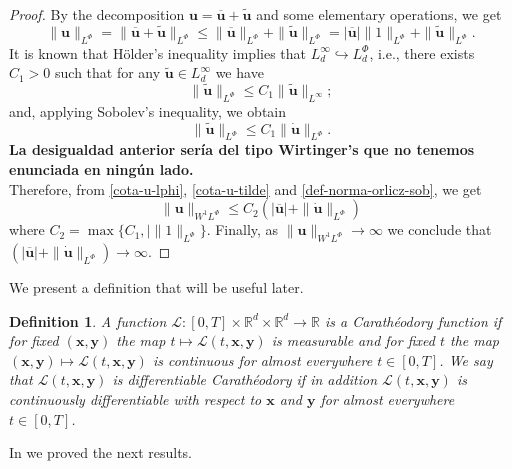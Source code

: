 \documentclass[twoside]{article}
\newtheorem{defi}[thm]{Definition}
\theoremstyle{remark}
\newcommand{\orlnor}{\|_{L^{\Phi}}}
\newcommand{\lphi}{L^{\Phi}}
\newcommand{\sobnor}{\|_{W^{1}\lphi}}
\renewcommand{\b}[1]{\boldsymbol{#1}}
\renewcommand{\leq}{\leqslant}
\begin{document}
\begin{proof}
By the decomposition $\b{u}=\b{\overline u}+\b{\tilde{u}}$ and some elementary operations, 
we get
\begin{equation}\label{cota-u-lphi}
\|\b{u}\orlnor=
\|\b{\overline u}+\b{\tilde{u}}\orlnor\leq 
\|\b{\overline u}\orlnor+\|\b{\tilde{u}}\orlnor=
|\b{\overline u}|\|1\orlnor+\|\b{\tilde{u}}\orlnor.
\end{equation}
It is known that H\"older's inequality implies that $L^{\infty}_d\hookrightarrow\lphi_d$, i.e.,
there exists $C_1>0$ such that for any $\b{\tilde{u}}\in L^{\infty}_d$ we have
\[
\|\b{\tilde{u}}\orlnor
\leq 
C_1 \|\b{\tilde{u}}\|_{L^{\infty}};
\]
and, applying  Sobolev's inequality,  we obtain  
\begin{equation}\label{cota-u-tilde}
\|\b{\tilde{u}}\orlnor
\leq 
C_1\|\b{\dot{u}}\orlnor.
\end{equation}
{\bf La desigualdad anterior ser\'ia del tipo Wirtinger's que no tenemos enunciada en ning\'un lado.}
\\
Therefore, from \eqref{cota-u-lphi}, \eqref{cota-u-tilde} and \eqref{def-norma-orlicz-sob}, 
we get
\[
\|\b{u}\sobnor\leq
C_2(|\b{\overline u}|+\|\b{\dot{u}}\orlnor)
\]
where $C_2=\max\{C_1, |\|1\orlnor\}$. Finally, as $\|\b{u}\sobnor\to \infty$ we conclude that   
$(|\b{\overline u}|+\|\b{\dot{u}}\orlnor)\to \infty$.
\end{proof}


We present a definition that will be useful later.
 
\begin{defi} A function $\mathcal{L}:[0,T]\times \mathbb{R}^d \times \mathbb{R}^d \rightarrow \mathbb{R}$ is a \emph{Carath\'eodory} function if for fixed $(\b{x},\b{y})$
the map $t \mapsto \mathcal{L}(t, \b{x},\b{y})$ is measurable  and for fixed $t$ the map  $(\b{x},\b{y}) \mapsto \mathcal{L}(t, \b{x}, \b{y})$ is continuous  for almost everywhere $t\in [0,T]$. We say that 
$\mathcal{L}(t, \b{x},\b{y})$ is  \emph{differentiable Carath\'eodory} if in addition $\mathcal{L}(t, \b{x},\b{y})$ is continuously differentiable with respect to $\b{x}$ and $\b{y}$  for almost everywhere $t\in [0,T]$.

\end{defi}


In \cite{ABGMS2015} we proved the next results.
\end{document}
